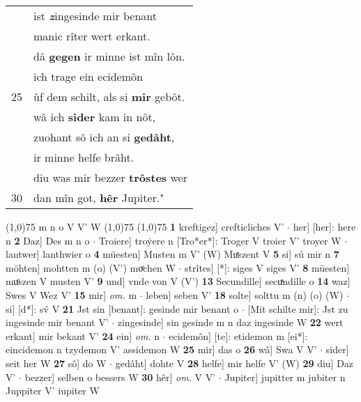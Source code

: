 \documentclass[8pt,a4paper,notitlepage]{article}
\begin{document}
\begin{table}[ht]
\begin{minipage}[t]{0.5\linewidth}
\begin{tabular}{rl}
 & ist \textit{\textbf{z}}ingesinde mir benant\\ 
 & manic rîter wert erkant.\\ 
 & dâ \textbf{gegen} ir minne ist mîn lôn.\\ 
 & ich trage ein ecidemôn\\ 
25 & ûf dem schilt, als si \textbf{mir} gebôt.\\ 
 & wâ ich \textbf{sider} kam in nôt,\\ 
 & zuohant sô ich an si \textbf{gedâht},\\ 
 & ir minne helfe brâht.\\ 
 & diu was mir bezzer \textbf{trôstes} wer\\ 
30 & dan mîn got, \textbf{hêr} Jupiter."\\ 
\end{tabular}
\scriptsize
\line(1,0){75} \newline
m n o V V' W \newline
\line(1,0){75} \newline
\newline
\line(1,0){75} \newline
\textbf{1} kreftigez] crefticliches V'  $\cdot$ her] [her]: here n \textbf{2} Daz] Des m n o  $\cdot$ Troiere] troẏere n [Tro*er*]: Troger V troier V' troyer W  $\cdot$ lantwer] lanthwier o \textbf{4} müesten] Musten m V' (W) Muͤszent V \textbf{5} si] sú mir n \textbf{7} möhten] mohtten m (o) (V') moͤchen W  $\cdot$ strîtes] [*]: siges V siges V' \textbf{8} müesten] muͦszen V musten V' \textbf{9} und] vnde von V (V') \textbf{13} Secundille] secuͯndille o \textbf{14} waz] Swes V Wez V' \textbf{15} mir] \textit{om.} m  $\cdot$ leben] seben V' \textbf{18} solte] solttu m (n) (o) (W)  $\cdot$ si] [d*]: sv́ V \textbf{21} Jst sin [benant]: gesinde mir benant o  $\cdot$ [Mit schilte mir]: Jst zu ingesinde mir benant V'  $\cdot$ zingesinde] sin gesinde m n daz ingesinde W \textbf{22} wert erkant] mir bekant V' \textbf{24} ein] \textit{om.} n  $\cdot$ ecidemôn] [te]: etidemon m [ei*]: eincidemon n tzydemon V' assidemon W \textbf{25} mir] das o \textbf{26} wâ] Swa V V'  $\cdot$ sider] seit her W \textbf{27} sô] do W  $\cdot$ gedâht] dohte V \textbf{28} helfe] mir helfe V' (W) \textbf{29} diu] Daz V'  $\cdot$ bezzer] selben o bessers W \textbf{30} hêr] \textit{om.} V V'  $\cdot$ Jupiter] jupitter m jubiter n Juppiter V' iupiter W \newline
\end{minipage}
\end{table}
\newpage
\end{document}
